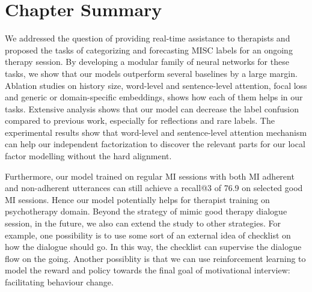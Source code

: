 \section{Chapter Summary}
\label{sec:snt:conclusion}

We addressed the question of providing real-time assistance to
therapists and proposed the tasks of categorizing and forecasting MISC
labels for an ongoing therapy session. By developing a modular family
of neural networks for these tasks, we show that our models outperform
several baselines by a large margin.  Ablation studies on history
size, word-level and sentence-level attention, focal loss and generic
or domain-specific embeddings, shows how each of them helps in our
tasks. Extensive analysis shows that our model can decrease the label
confusion compared to previous work, especially for reflections and
rare labels. The experimental results show that word-level and sentence-level attention
mechanism can help our independent factorization to discover the
relevant parts for our local factor modelling without the hard
alignment.

Furthermore, our model trained on regular MI sessions with both MI
adherent and non-adherent utterances can still achieve a recall@3 of
76.9 on selected good MI sessions. Hence our model potentially helps
for therapist training on psychotherapy domain. Beyond the strategy of
mimic good therapy dialogue session, in the future, we also can extend
the study to other strategies. For example, one possibility is to use
some sort of an external idea of checklist on how the dialogue should
go. In this way, the checklist can supervise the dialogue flow on the
going. Another possiblity is that we can use reinforcement learning to
model the reward and policy towards the final goal of motivational
interview: facilitating behaviour change.

